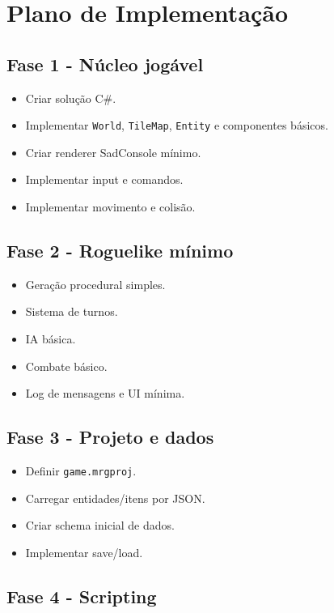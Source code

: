 \documentclass[12pt,a4paper]{article}
\begin{document}
\section{Plano de Implementação}

\subsection{Fase 1 - Núcleo jogável}

\begin{itemize}
    \item Criar solução C\#.
    \item Implementar \texttt{World}, \texttt{TileMap}, \texttt{Entity} e componentes básicos.
    \item Criar renderer SadConsole mínimo.
    \item Implementar input e comandos.
    \item Implementar movimento e colisão.
\end{itemize}

\subsection{Fase 2 - Roguelike mínimo}

\begin{itemize}
    \item Geração procedural simples.
    \item Sistema de turnos.
    \item IA básica.
    \item Combate básico.
    \item Log de mensagens e UI mínima.
\end{itemize}

\subsection{Fase 3 - Projeto e dados}

\begin{itemize}
    \item Definir \texttt{game.mrgproj}.
    \item Carregar entidades/itens por JSON.
    \item Criar schema inicial de dados.
    \item Implementar save/load.
\end{itemize}

\subsection{Fase 4 - Scripting}
\end{document}
